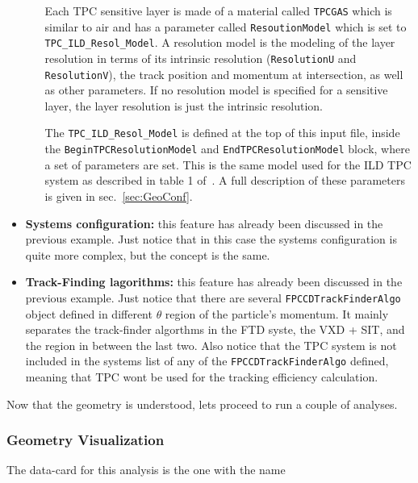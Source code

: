 \begin{itemize}
\begin{itemize}
    Each TPC sensitive layer is made of a material called {\tt TPCGAS} which is similar to air and has a parameter called {\tt ResoutionModel} which is set to 
    {\tt TPC\_ILD\_Resol\_Model}. A resolution model is the modeling of the layer resolution in terms of its intrinsic resolution ({\tt ResolutionU} and {\tt ResolutionV}), 
    the track position and momentum at intersection, as well as other parameters. If no resolution model is specified for a sensitive layer, the layer resolution is just the 
    intrinsic resolution.
    
    The {\tt TPC\_ILD\_Resol\_Model} is defined at the top of this input file, inside the {\tt BeginTPCResolutionModel} and {\tt EndTPCResolutionModel} block, 
    where a set of parameters are set. This is the same model used for the ILD TPC system as described in table 1 of~\cite{bib:ILDTracking}. A full description 
    of these parameters is given in sec.~\ref{sec:GeoConf}.
     
   \end{itemize}
   
 \item {\bf Systems configuration:} this feature has already been discussed in the previous example. Just notice that in this case the systems configuration 
 is quite more complex, but the concept is the same.
 
 \item {\bf Track-Finding lagorithms:} this feature has already been discussed in the previous example. Just notice that there are several {\tt FPCCDTrackFinderAlgo} 
 object defined in different $\theta$ region of the particle's momentum. It mainly separates the track-finder algorthms in the FTD syste, the VXD + SIT, and the region 
 in between the last two. Also notice that the TPC system is not included in the systems list of any of the {\tt FPCCDTrackFinderAlgo} defined, meaning that TPC wont be 
 used for the tracking efficiency calculation.

\end{itemize}

\noindent
Now that the geometry is understood, lets proceed to run a couple of analyses.

\subsubsection*{Geometry Visualization}

The data-card for this analysis is the one with the name

